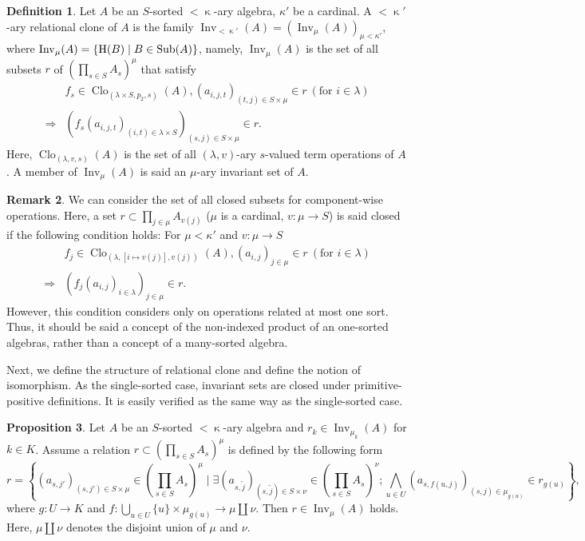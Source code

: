 \documentclass[a4paper,10pt]{article}
\theoremstyle{definition}
\newtheorem{df}{Definition}[section]
\newtheorem{prop}[df]{Proposition}
\newtheorem{rem}[df]{Remark}
\newcommand\ra{\rightarrow}
\newcommand\mc{\mathclose}
\DeclareMathOperator{\Clo}{Clo}
\DeclareMathOperator{\Inv}{Inv}
\DeclareMathOperator{\Sub}{Sub}
\begin{document}
\begin{df}
Let $A$ be an $S$-sorted $<\mc\kappa$-ary algebra, $\kappa'$ be a cardinal.
A $<\mc\kappa'$-ary relational clone of $A$ is the family $\Inv_{<\mc\kappa'}(A)=(\Inv_\mu(A))_{\mu<\kappa'}$,
where $\Inv_\mu(A)=\{{\rm H}(B)\mid B\in\Sub(A)\}$,
namely, $\Inv_\mu(A)$ is the set of all subsets $r$ of
$\left(\prod_{s\in S}A_s\right)^\mu$ that satisfy
\begin{align*}
&f_s\in \Clo_{(\lambda\times S,p_2,s)}(A),(a_{i,j,t})_{(t,j)\in S\times\mu}\in r\ (\text{for }i\in\lambda)\\
\Longrightarrow& (f_s(a_{i,j,t})_{(i,t)\in\lambda\times S})_{(s,j)\in S\times\mu}\in r.
\end{align*}
Here, $\Clo_{(\lambda,v,s)}(A)$ is the set of all $(\lambda,v)$-ary $s$-valued term operations of $A$.
A member of $\Inv_\mu(A)$ is said an $\mu$-ary invariant set of $A$.
\end{df}

\begin{rem}
We can consider the set of all closed subsets for component-wise operations.
Here, a set
$r\subset \prod_{j\in\mu}A_{v(j)}$ ($\mu$ is a cardinal, $v:\mu\ra S$) is said
closed if the following condition holds:
For $\mu<\kappa'$ and $v:\mu\ra S$
\begin{align*}
&f_j\in \Clo_{(\lambda,[i\mapsto v(j)],v(j))}(A),(a_{i,j})_{j\in\mu}\in r\ (\text{for }i\in\lambda)\\
\Longrightarrow& (f_j(a_{i,j})_{i\in\lambda})_{j\in\mu}\in r.
\end{align*}
However, this condition considers only on operations related at most one sort.
Thus, it should be said a concept of the non-indexed product
of an one-sorted algebras, rather than a concept of a many-sorted algebra.
\end{rem}

Next, we define the structure of relational clone and define the notion of isomorphism.
As the single-sorted case, invariant sets are closed under primitive-positive definitions. It is easily verified as the same way as the single-sorted case.
\begin{prop}
Let $A$ be an $S$-sorted $<\mc\kappa$-ary algebra and $r_k\in \Inv_{\mu_k}(A)$ for $k\in K$.
Assume a relation $r\subset \left(\prod_{s\in S}A_s\right)^{\mu}$ is defined by the following form
\[
r=\left\{(a_{s,j'})_{(s,j')\in S\times\mu}\in \left(\prod_{s\in S}A_s\right)^{\mu}\mid 
  \exists (a_{s,\tilde{j}})_{(s,\tilde{j})\in S\times \nu}\in \left(\prod_{s\in S}A_s\right)^\nu;
  \bigwedge_{u\in U} (a_{s,f(u,j)})_{(s,j)\in \mu_{g(u)}}\in r_{g(u)}\right\},
\]
where $g:U\ra K$ and $f:\bigcup_{u\in U}\{u\}\times \mu_{g(u)}\ra \mu\amalg \nu$.
Then $r\in \Inv_\mu(A)$ holds.
Here, $\mu\amalg\nu$ denotes the disjoint union of $\mu$ and $\nu$.
\end{prop}
\end{document}
